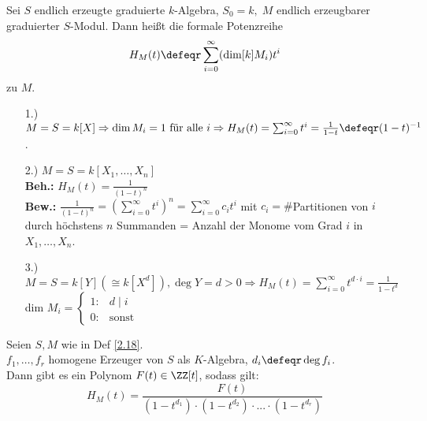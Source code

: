 \begin{Def}
\label{2.18}
  Sei $S$ endlich erzeugte graduierte $k$-Algebra, $S_0 = k,\; M$ endlich
  erzeugbarer graduierter $S$-Modul. Dann heißt die formale Potenzreihe $$H_M(t)
  \defeqr \sum_{i=0}^{\infty} (\dim[k]{M_i}) t^i$$
   zu $M$.
\end{Def}

\begin{nnBsp}
  \begin{enumerate}
    \item[1.)] $M = S = k[X] \Rightarrow \dim{M_i} = 1 \text{ für alle }i
               \Rightarrow H_M(t) = \sum_{i=0}^{\infty}t^i = \frac{1}{1-t}
               \defeqr (1-t)^{-1}$.
    \item[2.)] $M = S = k[X_1, \dots, X_n]$\\
               \textbf{Beh.:} $H_M(t) = \frac{1}{(1-t)^n}$\\
               \textbf{Bew.:} $\frac{1}{(1-t)^n} = \left( \sum_{i=0}^{\infty}
               t^i\right)^n = \sum_{i=0}^{\infty} c_i t^i$ mit $c_i =
               \#$Partitionen von $i$ durch höchstens $n$ Summanden = Anzahl der
               Monome vom Grad $i$ in $X_1, \dots, X_n$.
    \item[3.)] $M = S = k[Y] (\cong k[X^d]), \deg{Y} = d > 0 \Rightarrow
               H_M(t) = \sum_{i = 0}^{\infty} t^{d \cdot i} = \frac{1}{1-t^d}$\\
               dim $M_i = \begin{cases}1: & d \mid i\\ 0: & \text{sonst} \end{cases}$
  \end{enumerate}
\end{nnBsp}

\begin{nnSatz}
  Seien $S, M$ wie in Def \ref{2.18}.\\
  $f_1, \dots, f_r$ homogene Erzeuger von $S$ als $K$-Algebra, $d_i \defeqr
  \deg{f_i}$.\\
  Dann gibt es ein Polynom $F(t) \in \ZZ[t]$, sodass gilt:
  $$ H_M(t) = \frac{F(t)}{(1-t^{d_1}) \cdot (1-t^{d_2}) \cdot ... \cdot 
  (1-t^{d_r})}$$
\end{nnSatz}


